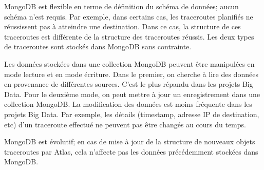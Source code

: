 MongoDB est flexible en terme de définition du schéma de données; aucun schéma n'est requis.   Par exemple, dans certains cas, les traceroutes planifiés ne réussissent pas à atteindre une destination. Dans ce cas, la structure de ces  traceroutes est différente  de la structure des traceroutes réussis. Les deux types de traceroutes sont stockés dans MongoDB sans contrainte.

Les données stockées dans une collection MongoDB peuvent être manipulées en mode lecture et en mode écriture. Dans le premier, on cherche à lire des données en provenance de différentes sources. C'est le plus répandu dans les projets Big Data. Pour le deuxième mode, on peut mettre à jour un enregistrement dans une collection MongoDB. La modification des données  est moins fréquente dans les projets Big Data. Par exemple, les détails (timestamp, adresse IP de destination, etc) d'un traceroute effectué ne peuvent pas être changés au cours du temps.

 
 MongoDB est évolutif; en cas de   mise à jour de la structure de nouveaux  objets traceroutes par Atlas,  cela n'affecte pas les données précédemment  stockées  dans MongoDB.
 





